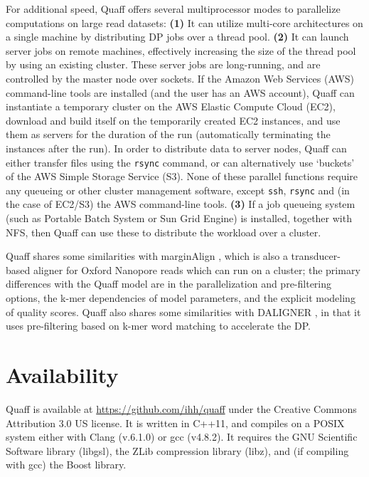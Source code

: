 \documentclass{bioinfo}
\begin{document}
\begin{methods}
For additional speed, Quaff offers several multiprocessor modes to parallelize computations on large read datasets: {\bf (1)} It can utilize multi-core architectures on a single machine by distributing DP jobs over a thread pool. {\bf (2)} It can launch server jobs on remote machines, effectively increasing the size of the thread pool by using an existing cluster. These server jobs are long-running, and are controlled by the master node over sockets. If the Amazon Web Services (AWS) command-line tools are installed (and the user has an AWS account), Quaff can instantiate a temporary cluster on the AWS Elastic Compute Cloud (EC2), download and build itself on the temporarily created EC2 instances, and use them as servers for the duration of the run (automatically terminating the instances after the run). In order to distribute data to server nodes, Quaff can either transfer files using the {\tt rsync} command, or can alternatively use `buckets' of the AWS Simple Storage Service (S3). None of these parallel functions require any queueing or other cluster management software, except {\tt ssh}, {\tt rsync} and (in the case of EC2/S3) the AWS command-line tools. {\bf (3)} If a job queueing system (such as Portable Batch System or Sun Grid Engine) is installed, together with NFS, then Quaff can use these to distribute the workload over a cluster.

Quaff shares some similarities with marginAlign \citep{Jain2015-by}, which is also a transducer-based aligner for Oxford Nanopore reads which can run on a cluster; the primary differences with the Quaff model are in the parallelization and pre-filtering options, the k-mer dependencies of model parameters, and the explicit modeling of quality scores. Quaff also shares some similarities with DALIGNER \citep{Myers2014-em}, in that it uses pre-filtering based on k-mer word matching to accelerate the DP.



\end{methods}





\section{Availability}

Quaff is available at \url{https://github.com/ihh/quaff} under the Creative Commons Attribution 3.0 US license. It is written in C++11, and compiles on a POSIX system either with Clang (v.6.1.0) or gcc (v4.8.2). It requires the GNU Scientific Software library (libgsl), the ZLib compression library (libz), and (if compiling with gcc) the Boost library.
\end{document}
